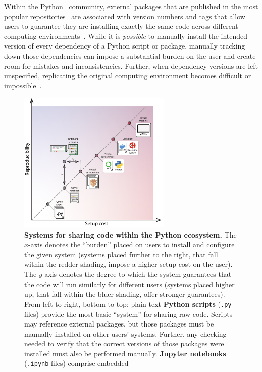\documentclass[preprint,12pt,a4paper]{elsarticle}
\begin{document}
Within the Python~\cite{vanR95} community, external packages that are
published in the most popular repositories~\cite{Pyth03, cond15} are
associated with version numbers and tags that allow users to guarantee
they are installing exactly the same code across different computing
environments~\cite{CoghStuf13}. While it is \textit{possible} to
manually install the intended version of every dependency of a Python
script or package, manually tracking down those dependencies can
impose a substantial burden on the user and create room for mistakes
and inconsistencies. Further, when dependency versions are left
unspecified, replicating the original computing environment becomes
difficult or impossible~\citep{PimeEtal19}.

\begin{figure}[tp]
\centering
\includegraphics[width=0.65\textwidth]{figs/shareable_code_2d}
\caption{\small \textbf{Systems for sharing code within the Python
  ecosystem.} The $x$-axis denotes the ``burden'' placed on users to
  install and configure the given system (systems placed further to the right, that fall within the redder shading, impose a higher setup cost on the user). The $y$-axis denotes the
  degree to which the system guarantees that the code will run
  similarly for different users (systems placed higher up, that fall within the bluer shading, offer stronger guarantees).
  From left to right, bottom to top: plain-text \textbf{Python
  scripts} (\texttt{.py} files) provide the most basic ``system''
  for sharing raw code. Scripts may reference external packages, but
  those packages must be manually installed on other users' systems.
  Further, any checking needed to verify that the correct versions of
  those packages were installed must also be performed manually.
  \textbf{Jupyter notebooks} (\texttt{.ipynb} files) comprise embedded
}
\end{figure}
\end{document}
